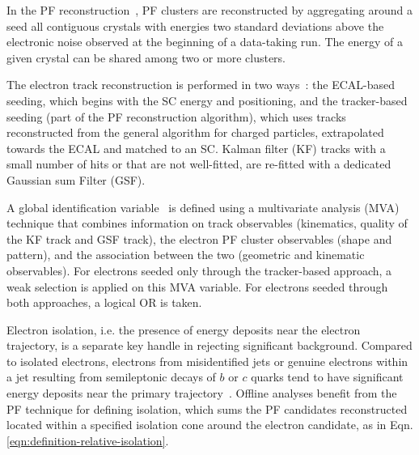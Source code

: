 In the PF reconstruction~\citep{JINST-2015-10-P06005}, PF clusters are reconstructed by aggregating around a seed all contiguous crystals with energies two standard deviations above the electronic noise observed at the beginning of a data-taking run. The energy of a given crystal can be shared among two or more clusters.

The electron track reconstruction is performed in two ways~\citep{JINST-2015-10-P06005}: the ECAL-based seeding, which begins with the SC energy and positioning, and the tracker-based seeding (part of the PF reconstruction algorithm), which uses tracks reconstructed from the general algorithm for charged particles, extrapolated towards the ECAL and matched to an SC. Kalman filter (KF) tracks with a small number of hits or that are not well-fitted, are re-fitted with a dedicated Gaussian sum Filter (GSF).

A global identification variable~\citep{JINST-2015-10-P06005} is defined using a multivariate analysis (MVA) technique that combines information on track observables (kinematics, quality of the KF track and GSF track), the electron PF cluster observables (shape and pattern), and the association between the two (geometric and kinematic observables). For electrons seeded only through the tracker-based approach, a weak selection is applied on this MVA variable. For electrons seeded through both approaches, a logical OR is taken. 

Electron isolation, i.e. the presence of energy deposits near the electron trajectory, is a separate key handle in rejecting significant background. Compared to isolated electrons, electrons from misidentified jets or genuine electrons within a jet resulting from semileptonic decays of $b$ or $c$ quarks tend to have significant energy deposits near the primary trajectory~\citep{JINST-2015-10-P06005}. Offline analyses benefit from the PF technique for defining isolation, which sums the PF candidates reconstructed located within a specified isolation cone around the electron candidate, as in Eqn. \ref{eqn:definition-relative-isolation}.

